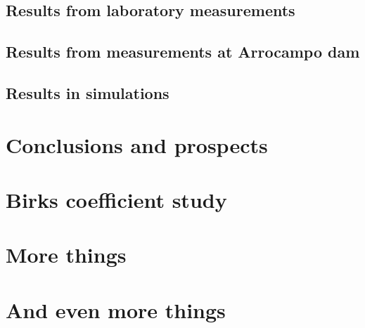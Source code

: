\documentclass[12pt,a4paper]{book}
\begin{document}
	\section{Results from laboratory measurements}
	\newpage
		
	\section[Results in Arrocampo dam]{Results from measurements at Arrocampo dam}
	\newpage
	
	\section{Results in simulations}
	\newpage		

\chapter{Conclusions and prospects}  \label{chap:Conclusions}

\newpage


\appendix
\appendixpage
\noappendicestocpagenum
\addappheadtotoc

\chapter{Birks coefficient study}\label{App:BirksA}


\chapter{More things}\label{App:B}


\chapter{And even more things}\label{App:C}



\end{document}

